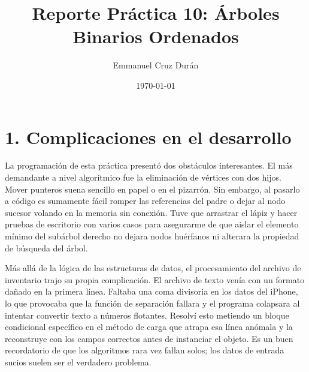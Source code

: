 \documentclass[12pt, letterpaper]{article}
\title{Reporte Práctica 10: Árboles Binarios Ordenados}
\author{Emmanuel Cruz Durán}
\date{\today}
\begin{document}
\maketitle

\section*{1. Complicaciones en el desarrollo}
La programación de esta práctica presentó dos obstáculos interesantes. El más demandante a nivel algorítmico fue la eliminación de vértices con dos hijos. Mover punteros suena sencillo en papel o en el pizarrón. Sin embargo, al pasarlo a código es sumamente fácil romper las referencias del padre o dejar al nodo sucesor volando en la memoria sin conexión. Tuve que arrastrar el lápiz y hacer pruebas de escritorio con varios casos para asegurarme de que aislar el elemento mínimo del subárbol derecho no dejara nodos huérfanos ni alterara la propiedad de búsqueda del árbol. 

Más allá de la lógica de las estructuras de datos, el procesamiento del archivo de inventario trajo su propia complicación. El archivo de texto venía con un formato dañado en la primera línea. Faltaba una coma divisoria en los datos del iPhone, lo que provocaba que la función de separación fallara y el programa colapsara al intentar convertir texto a números flotantes. Resolví esto metiendo un bloque condicional específico en el método de carga que atrapa esa línea anómala y la reconstruye con los campos correctos antes de instanciar el objeto. Es un buen recordatorio de que los algoritmos rara vez fallan solos; los datos de entrada sucios suelen ser el verdadero problema.
\end{document}
